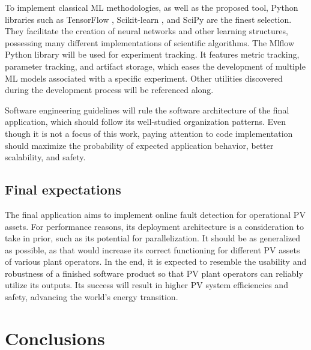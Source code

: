 To implement classical ML methodologies, as well as the proposed tool, Python libraries such as TensorFlow \cite{tensorflow}, Scikit-learn \cite{sklearn}, and SciPy \cite{scipy} are the finest selection. They facilitate the creation of neural networks and other learning structures, possessing many different implementations of scientific algorithms. The Mlflow \cite{mlflow} Python library will be used for experiment tracking. It features metric tracking, parameter tracking, and artifact storage, which eases the development of multiple ML models associated with a specific experiment. Other utilities discovered during the development process will be referenced along.

Software engineering guidelines will rule the software architecture of the final application, which should follow its well-studied organization patterns. Even though it is not a focus of this work, paying attention to code implementation should maximize the probability of expected application behavior, better scalability, and safety.


\section{Final expectations}

The final application aims to implement online fault detection for operational PV assets. For performance reasons, its deployment architecture is a consideration to take in prior, such as its potential for parallelization. It should be as generalized as possible, as that would increase its correct functioning for different PV assets of various plant operators. In the end, it is expected to resemble the usability and robustness of a finished software product so that PV plant operators can reliably utilize its outputs. Its success will result in higher PV system efficiencies and safety, advancing the world's energy transition.

\chapter{Conclusions}


